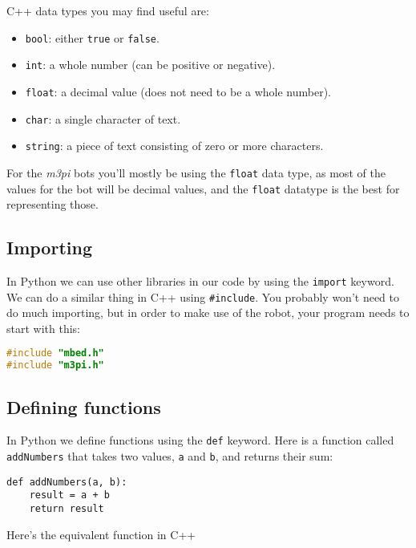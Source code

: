 \newpage

C++ data types you may find useful are:

\begin{itemize}
\tightlist
\item
  \lstinline!bool!: either \lstinline!true! or \lstinline!false!.
\item
  \lstinline!int!: a whole number (can be positive or negative).
\item
  \lstinline!float!: a decimal value (does not need to be a whole
  number).
\item
  \lstinline!char!: a single character of text.
\item
  \lstinline!string!: a piece of text consisting of zero or more
  characters.
\end{itemize}

For the \emph{m3pi} bots you'll mostly be using the \lstinline!float!
data type, as most of the values for the bot will be decimal values, and
the \lstinline!float! datatype is the best for representing those.

\subsection{Importing}\label{importing}

In Python we can use other libraries in our code by using the
\lstinline!import! keyword. We can do a similar thing in C++ using
\lstinline!#include!. You probably won't need to do much importing, but
in order to make use of the robot, your program needs to start with
this:

\begin{lstlisting}[language={C++}]
#include "mbed.h"
#include "m3pi.h"
\end{lstlisting}

\subsection{Defining functions}\label{defining-functions}

In Python we define functions using the \lstinline!def! keyword. Here is
a function called \lstinline!addNumbers! that takes two values,
\lstinline!a! and \lstinline!b!, and returns their sum:

\begin{lstlisting}
def addNumbers(a, b):
    result = a + b
    return result
\end{lstlisting}

Here's the equivalent function in C++

